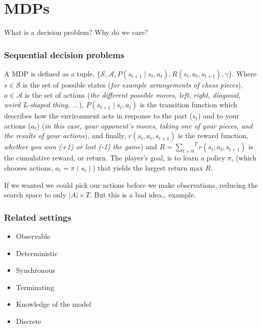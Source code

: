 \chapter{MDPs}

What is a decision problem?
Why do we care?

\hypertarget{sequential-decision-problems}{%
\subsection{Sequential decision
problems}\label{sequential-decision-problems}}

A MDP is defined as a tuple, \(\{\mathcal S, \mathcal A, P(s_{t+1} \mid s_t, a_t),R(s_t, a_t, s_{t+1}), \gamma\}\)\footnotemark[1]. Where \(s \in \mathcal S\) is the set of possible states (\textit{for example arrangements of chess pieces}), \(a \in \mathcal A\) is the set of actions (\textit{the different possible moves, left, right, diagonal, weird L-shaped thing, ...}),  \(P(s_{t+1} \mid s_t, a_t)\) is the transition function which describes how the environment acts in response to the past (\(s_t\)) and to your actions (\(a_t\)) (\textit{in this case, your opponent's moves, taking one of your pieces, and the results of your actions}), and finally, \(r(s_t, a_t, s_{t+1})\) is the reward function, \textit{whether you won (+1) or lost (-1) the game}) and \(R ={\sum_{t=0}}^T r(s_t, a_t, s_{t+1}) \) is the cumulative reward, or return. The player's goal, is to learn a policy \(\pi\), (which chooses actions, \(a_t = \pi(s_t)\)) that yields the largest return \(\text{max } R\).


If we wanted we could pick our actions before we make observations,
reducing the search space to only \(|A| \times T\). But this is a bad idea\ldots{} example.

\hypertarget{mdps}{%
\subsection{Related settings}\label{mdps}}

\begin{itemize}
\tightlist
\item
  Observable
\item
  Deterministic
\item
  Synchronous
\item
  Terminating
\item
  Knowledge of the model
\item
  Discrete
\end{itemize}

